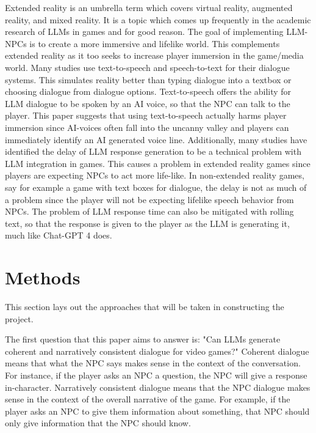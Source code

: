 \documentclass[10pt,twocolumn]{article}
\begin{document}
            \par
            Extended reality is an umbrella term which covers virtual reality, augmented reality, and mixed reality. It is a topic which comes up frequently in the academic research of LLMs in games and for good reason. The goal of implementing LLM-NPCs is to create a more immersive and lifelike world. This complements extended reality as it too seeks to increase player immersion in the game/media world. Many studies use text-to-speech and speech-to-text for their dialogue systems. This simulates reality better than typing dialogue into a textbox or choosing dialogue from dialogue options. Text-to-speech offers the ability for LLM dialogue to be spoken by an AI voice, so that the NPC can talk to the player. This paper suggests that using text-to-speech actually harms player immersion since AI-voices often fall into the uncanny valley and players can immediately identify an AI generated voice line. Additionally, many studies have identified the delay of LLM response generation to be a technical problem with LLM integration in games. This causes a problem in extended reality games since players are expecting NPCs to act more life-like. In non-extended reality games, say for example a game with text boxes for dialogue, the delay is not as much of a problem since the player will not be expecting lifelike speech behavior from NPCs. The problem of LLM response time can also be mitigated with rolling text, so that the response is given to the player as the LLM is generating it, much like Chat-GPT 4 does.

\section{Methods}

    \par
    This section lays out the approaches that will be taken in constructing the project. 

    \par 
    The first question that this paper aims to answer is: "Can LLMs generate coherent and narratively consistent dialogue for video games?" Coherent dialogue means that what the NPC says makes sense in the context of the conversation. For instance, if the player asks an NPC a question, the NPC will give a response in-character. Narratively consistent dialogue means that the NPC dialogue makes sense in the context of the overall narrative of the game. For example, if the player asks an NPC to give them information about something, that NPC should only give information that the NPC should know. 
\end{document}
